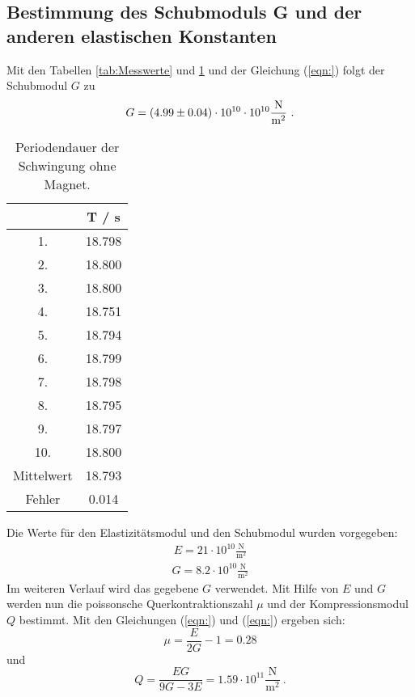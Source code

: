 \subsection{Bestimmung des Schubmoduls G und der anderen elastischen Konstanten}
Mit den Tabellen \ref{tab:Messwerte} und \ref{tab:Periodendauer1} und der Gleichung (\ref{eqn:}) folgt der Schubmodul $G$ zu
\begin{align*}
  G = (\num{4.99 +- 0.04}) \cdot 10^{10} \cdot 10^{10} \frac{\text{N}}{\text{m}^2} \ .
\end{align*}

\begin{table}[H] %
  \centering
  \begin{tabular}{c c}
    \toprule
    & T / s \\
    \midrule
    1. & 18.798 \\
    2. & 18.800 \\
    3. & 18.800 \\
    4. & 18.751 \\
    5. & 18.794 \\
    6. & 18.799 \\
    7. & 18.798 \\
    8. & 18.795 \\
    9. & 18.797 \\
    10.& 18.800 \\
    \bottomrule
    Mittelwert & 18.793 \\
    Fehler & 0.014 \\
    \bottomrule
  \end{tabular}
  \caption{Periodendauer der Schwingung ohne Magnet.}
  \label{tab:Periodendauer1}
\end{table}

Die Werte für den Elastizitätsmodul und den Schubmodul wurden vorgegeben:
\begin{align*}
  E = 21 \cdot 10^{10} \frac{\text{N}}{\text{m}^2}
\end{align*}
\begin{align*}
  G = 8.2 \cdot 10^{10} \frac{\text{N}}{\text{m}^2}
\end{align*}
Im weiteren Verlauf wird das gegebene $G$ verwendet. Mit Hilfe von $E$ und $G$ werden nun die poissonsche Querkontraktionszahl $\mu$ und der Kompressionsmodul $Q$ bestimmt. Mit den Gleichungen (\ref{eqn:}) und (\ref{eqn:}) ergeben sich:
\begin{equation}
  \mu = \frac{E}{2G} - 1 = 0.28
\end{equation}
und
\begin{equation}
  Q = \frac{EG}{9G - 3E} = 1.59 \cdot 10^{11} \frac{\text{N}}{\text{m}^2} \ .
\end{equation}


